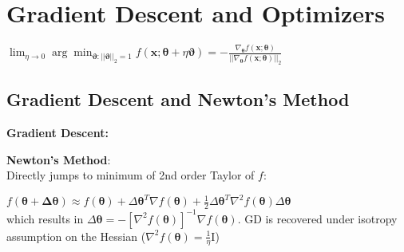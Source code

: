\color{black}
\section*{Gradient Descent and Optimizers}

\hspace{10pt} $\lim_{\eta\rightarrow0}\arg\min_{\pmb \vartheta:||\pmb\vartheta||_2=1}f(\mathbf{x};\pmb\theta +\eta\pmb\vartheta)=-\frac{\nabla_{\pmb\theta}f(\mathbf x;\pmb\theta)}{||\nabla_{\pmb\theta}f(\mathbf x;\pmb\theta)||_2}$\\

\subsection*{Gradient Descent and Newton's Method}
\textbf{Gradient Descent:}\\

\textbf{Newton's Method}:\\
Directly jumps to minimum of 2nd order Taylor of $f$:

\hspace{15pt} $f(\mathbf{\theta+\Delta \theta})\approx f(\mathbf \theta)+\Delta\mathbf \theta^T \nabla f(\mathbf \theta)+\frac{1}{2}\Delta\mathbf \theta^T\nabla^2f(\mathbf \theta)\Delta\mathbf \theta$\\
which results in $\Delta\mathbf \theta=-[\nabla^2f(\mathbf \theta)]^{-1}\nabla f(\mathbf \theta)$. GD is recovered under isotropy assumption on the Hessian ($\nabla^2 f(\mathbf \theta)=\frac{1}{\eta}\mathrm I$)

